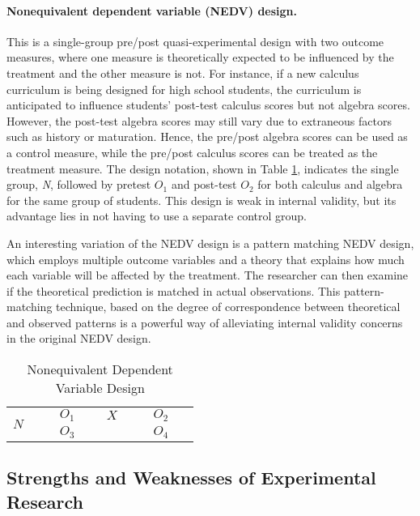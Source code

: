 \paragraph{Nonequivalent dependent variable (NEDV) design.} This is a single-group pre/post quasi-experimental design with two outcome measures, where one measure is theoretically expected to be influenced by the treatment and the other measure is not. For instance, if a new calculus curriculum is being designed for high school students, the curriculum is anticipated to influence students' post-test calculus scores but not algebra scores. However, the post-test algebra scores may still vary due to extraneous factors such as history or maturation. Hence, the pre/post algebra scores can be used as a control measure, while the pre/post calculus scores can be treated as the treatment measure. The design notation, shown in Table \ref{09:tab13}, indicates the single group, \textit{N}, followed by pretest $ O_1 $ and post-test $ O_2 $ for both calculus and algebra for the same group of students. This design is weak in internal validity, but its advantage lies in not having to use a separate control group.

An interesting variation of the NEDV design is a pattern matching NEDV design, which employs multiple outcome variables and a theory that explains how much each variable will be affected by the treatment. The researcher can then examine if the theoretical prediction is matched in actual observations. This pattern-matching technique, based on the degree of correspondence between theoretical and observed patterns is a powerful way of alleviating internal validity concerns in the original NEDV design.

\begin{table}[H]
	\centering
	\begin{tabularx}{0.65\linewidth}{p{0.15\linewidth}p{0.15\linewidth}p{0.15\linewidth}p{0.15\linewidth}}
		\toprule
		\multirow{2}{*}{$ N $} & $ O_1 $ & $ X $ & $ O_2 $ \\
		                       & $ O_3 $ &       & $ O_4 $ \\
		\bottomrule
	\end{tabularx}
	\caption{Nonequivalent Dependent Variable Design}
	\label{09:tab13}
\end{table}

\subsection{Strengths and Weaknesses of Experimental Research}

